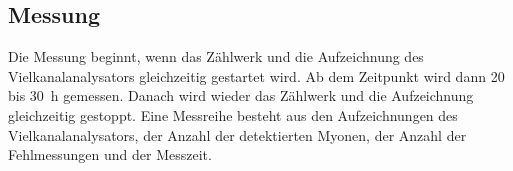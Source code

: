 \subsection{Messung} 
Die Messung beginnt, wenn das Zählwerk und die Aufzeichnung des Vielkanalanalysators gleichzeitig 
gestartet wird. Ab dem Zeitpunkt wird dann 20 bis \SI{30}{\hour} gemessen. 
Danach wird wieder das Zählwerk und die Aufzeichnung gleichzeitig gestoppt. Eine Messreihe besteht 
aus den Aufzeichnungen des Vielkanalanalysators, der Anzahl der detektierten Myonen, der Anzahl 
der Fehlmessungen und der Messzeit. 
